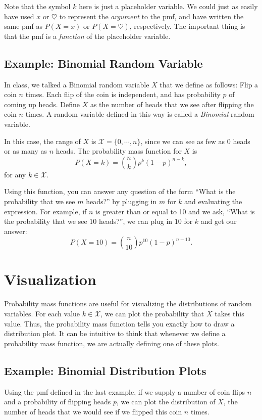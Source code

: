 \documentclass[11pt]{article}
\begin{document}
Note that the symbol $k$ here is just a placeholder variable. We could just as easily have used $x$ or $\heartsuit$ to represent the \emph{argument} to the pmf, and have written the same pmf as $P(X = x)$ or $P(X = \heartsuit)$, respectively. The important thing is that the pmf is a \emph{function} of the placeholder variable.

\subsection*{Example: Binomial Random Variable}

In class, we talked a Binomial random variable $X$ that we define as follows: Flip a coin $n$ times. Each flip of the coin is independent, and has probability $p$ of coming up heads. Define $X$ as the number of heads that we see after flipping the coin $n$ times. A random variable defined in this way is called a \emph{Binomial} random variable.

In this case, the range of $X$ is $\mathcal X = \{0, \cdots, n\}$, since we can see as few as $0$ heads or as many as $n$ heads. The probability mass function for $X$ is
$$
P(X = k) = {n \choose k} p^k (1-p)^{n-k},
$$
for any $k \in \mathcal X$.

Using this function, you can answer any question of the form ``What is the probability that we see $m$ heads?'' by plugging in $m$ for $k$ and evaluating the expression. For example, if $n$ is greater than or equal to 10 and we ask, ``What is the probability that we see $10$ heads?'', we can plug in $10$ for $k$ and get our answer:
$$
P(X = 10) = {n \choose 10} p^{10} (1-p)^{n-10}.
$$

\section*{Visualization}
Probability mass functions are useful for visualizing the distributions of random variables. For each value $k \in \mathcal X$, we can plot the probability that $X$ takes this value. Thus, the probability mass function tells you exactly how to draw a distribution plot. It can be intuitive to think that whenever we define a probability mass function, we are actually defining one of these plots.

\subsection*{Example: Binomial Distribution Plots}
Using the pmf defined in the last example, if we supply a number of coin flips $n$ and a probability of flipping heads $p$, we can plot the distribution of $X$, the number of heads that we would see if we flipped this coin $n$ times.
\end{document}
